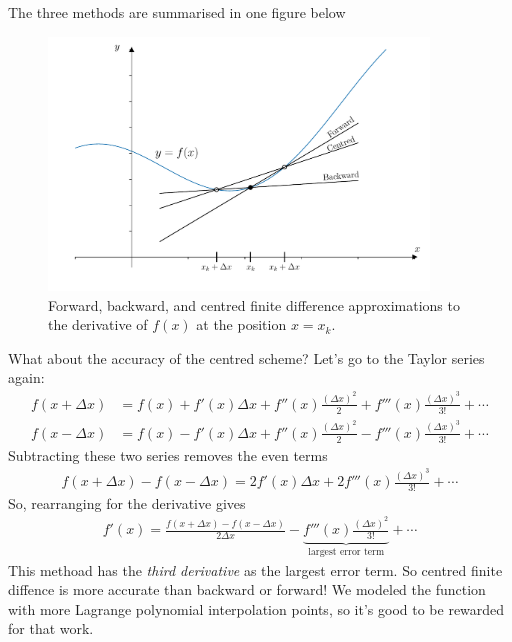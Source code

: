 \noindent {}

The three methods are summarised in one figure below
\begin{figure}[H]
	\begin{center}
	\includegraphics[width=0.9\textwidth]{figures/ch5_centred_forward_backward_difference.pdf} 
	  \caption{Forward, backward, and centred finite difference approximations to the derivative of $f(x)$ at the position $x=x_k$.} \label{fig:ch5_centred_forward_backward_difference}
	\end{center}
\end{figure}

What about the accuracy of the centred scheme? Let's go to the Taylor series again:
\begin{align*}
f(x+\Delta x) &= f(x) + f'(x) \Delta x + f''(x) \frac{\left( \Delta x\right)^2}{2} + f'''(x) \frac{\left( \Delta x\right)^3}{3!} + \cdots \\
f(x-\Delta x) &= f(x) - f'(x) \Delta x + f''(x) \frac{\left( \Delta x\right)^2}{2} - f'''(x) \frac{\left( \Delta x\right)^3}{3!} + \cdots
\end{align*}
Subtracting these two series removes the even terms
\begin{align*}
f(x+\Delta x) - f(x-\Delta x) = 2 f'(x) \Delta x + 2 f'''(x) \frac{\left( \Delta x\right)^3}{3!} + \cdots
\end{align*}
So, rearranging for the derivative gives
\begin{align*}
f'(x) = \frac{f(x+\Delta x) - f(x-\Delta x)}{2 \Delta x} - \underbrace{f'''(x) \frac{\left( \Delta x\right)^2}{3!}}_\text{largest error term} + \cdots
\end{align*}
This methoad has the \textit{third derivative} as the largest error term. So centred finite diffence is more accurate than backward or forward! We modeled the function with more Lagrange polynomial interpolation points, so it's good to be rewarded for that work.

